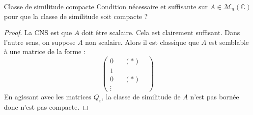 \documentclass[french,a4paper]{article}
\newcommand{\C}{\mathbb{C}}
\theoremstyle{plain}
\theoremstyle{definition}
\theoremstyle{remark}
\begin{document}
\begin{ex}{Classe de similitude compacte}
	Condition nécessaire et suffisante sur $A\in\mathcal{M}_n(\C)$ pour que la classe de similitude soit compacte ?
\end{ex}
\begin{proof}
	La CNS est que $A$ doit être scalaire. Cela est clairement suffisant. Dans l'autre sens, on suppose $A$ non scalaire. Alors il est classique que $A$ est semblable à une matrice de la forme : $$\begin{pmatrix}
		0&&(*)&\\
		1&&&\\
		0&&(*)&\\
		\vdots&&&
	\end{pmatrix}$$ En agissant avec les matrices $Q_\varepsilon$, la classe de similitude de $A$ n'est pas bornée donc n'est pas compacte. 
\end{proof}
\end{document}
